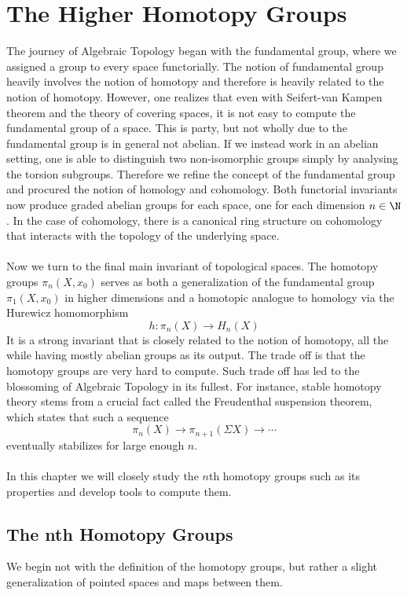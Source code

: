 \documentclass[a4paper]{article}
\begin{document}
\section{The Higher Homotopy Groups}
The journey of Algebraic Topology began with the fundamental group, where we assigned a group to every space functorially. The notion of fundamental group heavily involves the notion of homotopy and therefore is heavily related to the notion of homotopy. However, one realizes that even with Seifert-van Kampen theorem and the theory of covering spaces, it is not easy to compute the fundamental group of a space. This is party, but not wholly due to the fundamental group is in general not abelian. If we instead work in an abelian setting, one is able to distinguish two non-isomorphic groups simply by analysing the torsion subgroups. Therefore we refine the concept of the fundamental group and procured the notion of homology and cohomology. Both functorial invariants now produce graded abelian groups for each space, one for each dimension $n\in\N$. In the case of cohomology, there is a canonical ring structure on cohomology that interacts with the topology of the underlying space. \\~\\

Now we turn to the final main invariant of topological spaces. The homotopy groups $\pi_n(X,x_0)$ serves as both a generalization of the fundamental group $\pi_1(X,x_0)$ in higher dimensions and a homotopic analogue to homology via the Hurewicz homomorphism $$h:\pi_n(X)\to H_n(X)$$ It is a strong invariant that is closely related to the notion of homotopy, all the while having mostly abelian groups as its output. The trade off is that the homotopy groups are very hard to compute. Such trade off has led to the blossoming of Algebraic Topology in its fullest. For instance, stable homotopy theory stems from a crucial fact called the Freudenthal suspension theorem, which states that such a sequence $$\pi_n(X)\to\pi_{n+1}(\Sigma X)\to\cdots$$ eventually stabilizes for large enough $n$. \\~\\

In this chapter we will closely study the $n$th homotopy groups such as its properties and develop tools to compute them. 

\subsection{The nth Homotopy Groups}
We begin not with the definition of the homotopy groups, but rather a slight generalization of pointed spaces and maps between them. 
\end{document}
